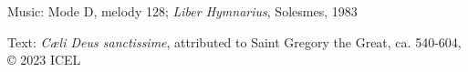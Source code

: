 

\begin{hymnsource}
Music: Mode D, melody 128; \emph{Liber Hymnarius}, Solesmes, 1983

Text: \emph{Cæli Deus sanctissime}, attributed to Saint Gregory the Great, ca. 540-604, © 2023 ICEL
\end{hymnsource}
